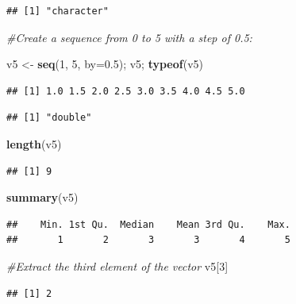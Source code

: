 \documentclass[
]{article}
\newenvironment{Shaded}{\begin{snugshade}}{\end{snugshade}}
\newcommand{\AttributeTok}[1]{\textcolor[rgb]{0.13,0.29,0.53}{#1}}
\newcommand{\CommentTok}[1]{\textcolor[rgb]{0.56,0.35,0.01}{\textit{#1}}}
\newcommand{\DecValTok}[1]{\textcolor[rgb]{0.00,0.00,0.81}{#1}}
\newcommand{\FloatTok}[1]{\textcolor[rgb]{0.00,0.00,0.81}{#1}}
\newcommand{\FunctionTok}[1]{\textcolor[rgb]{0.13,0.29,0.53}{\textbf{#1}}}
\newcommand{\NormalTok}[1]{#1}
\newcommand{\OtherTok}[1]{\textcolor[rgb]{0.56,0.35,0.01}{#1}}
\begin{document}
\begin{verbatim}
## [1] "character"
\end{verbatim}

\begin{Shaded}
\begin{Highlighting}[]
\CommentTok{\#Create a sequence from 0 to 5 with a step of 0.5:}

\NormalTok{v5 }\OtherTok{\textless{}{-}} \FunctionTok{seq}\NormalTok{(}\DecValTok{1}\NormalTok{, }\DecValTok{5}\NormalTok{, }\AttributeTok{by=}\FloatTok{0.5}\NormalTok{); v5; }\FunctionTok{typeof}\NormalTok{(v5)}
\end{Highlighting}
\end{Shaded}

\begin{verbatim}
## [1] 1.0 1.5 2.0 2.5 3.0 3.5 4.0 4.5 5.0
\end{verbatim}

\begin{verbatim}
## [1] "double"
\end{verbatim}

\begin{Shaded}
\begin{Highlighting}[]
\FunctionTok{length}\NormalTok{(v5)}
\end{Highlighting}
\end{Shaded}

\begin{verbatim}
## [1] 9
\end{verbatim}

\begin{Shaded}
\begin{Highlighting}[]
\FunctionTok{summary}\NormalTok{(v5)}
\end{Highlighting}
\end{Shaded}

\begin{verbatim}
##    Min. 1st Qu.  Median    Mean 3rd Qu.    Max. 
##       1       2       3       3       4       5
\end{verbatim}

\begin{Shaded}
\begin{Highlighting}[]
\CommentTok{\#Extract the third element of the vector}
\NormalTok{v5[}\DecValTok{3}\NormalTok{]}
\end{Highlighting}
\end{Shaded}

\begin{verbatim}
## [1] 2
\end{verbatim}
\end{document}
